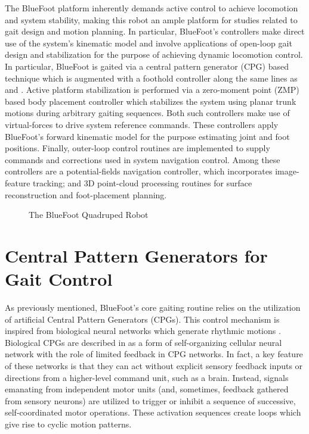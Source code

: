 		The BlueFoot platform inherently demands active control to achieve locomotion and system stability, making this robot an ample platform for studies related to gait design and motion planning. In particular, BlueFoot's controllers make direct use of the system's kinematic model and involve applications of open-loop gait design and stabilization for the purpose of achieving dynamic locomotion control. In particular, BlueFoot is gaited via a central pattern generator (CPG) based technique which is augmented with a foothold controller along the same lines as \cite{Ajallooeian2013} and \cite{Rutishauser2008}. Active platform stabilization is performed via a zero-moment point (ZMP) based body placement controller which stabilizes the system using planar trunk motions during arbitrary gaiting sequences. Both such controllers make use of virtual-forces to drive system reference commands. These controllers apply BlueFoot's forward kinematic model for the purpose estimating joint and foot positions. Finally, outer-loop control routines are implemented to supply commands and corrections used in system navigation control. Among these controllers are a potential-fields navigation controller, which incorporates image-feature tracking; and 3D point-cloud processing routines for surface reconstruction and foot-placement planning.
	
			\begin{figure}[h!]
				\centering
				\caption{The BlueFoot Quadruped Robot}
				\label{fig::bluefoot_glamour}
			\end{figure}





	\section{Central Pattern Generators for Gait Control}

		As previously mentioned, BlueFoot's core gaiting routine relies on the utilization of artificial Central Pattern Generators (CPGs). This control mechanism is inspired from biological neural networks which generate rhythmic motions \cite{Ijspeert2008}.  Biological CPGs are described in \cite{Arena2000} as a form of self-organizing cellular neural network with the role of limited feedback in CPG networks. In fact, a key feature of these networks is that they can act without explicit sensory feedback inputs or directions from a higher-level command unit, such as a brain. Instead, signals emanating from independent motor units (and, sometimes, feedback gathered from sensory neurons) are utilized to trigger or inhibit a sequence of successive, self-coordinated motor operations. These activation sequences create loops which give rise to cyclic motion patterns. 

